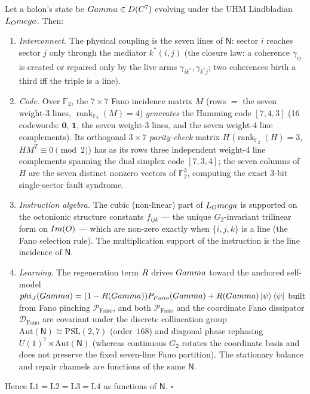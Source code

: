 \begin{theorem}\label{thm:collapse}
Let a holon's state be $Gamma\in D(C^7)$ evolving under the UHM
Lindbladian $L_Omega$. Then:
\begin{enumerate}[leftmargin=1.7em,itemsep=1pt]
  \item[\textbf{(L1)}] \emph{Interconnect.} The physical coupling is the seven
        lines of $\mathsf{N}$: sector $i$ reaches sector $j$ only through the
        mediator $k^\ast(i,j)$ (the closure law: a coherence
        $\gamma_{ij}$ is created or repaired only by the live arms
        $\gamma_{i k^\ast},\gamma_{k^\ast j}$; two coherences birth a third
        iff the triple is a line).
  \item[\textbf{(L2)}] \emph{Code.} Over $\mathbb{F}_2$, the $7\times 7$ Fano
        incidence matrix $M$ (rows $=$ the seven weight-$3$ lines,
        $\operatorname{rank}_{\mathbb{F}_2}(M)=4$) \emph{generates} the
        Hamming code $[7,4,3]$ (16 codewords: $\mathbf{0}$, $\mathbf{1}$, the
        seven weight-$3$ lines, and the seven weight-$4$ line complements). Its
        orthogonal $3\times 7$ \emph{parity-check} matrix $H$
        ($\operatorname{rank}_{\mathbb{F}_2}(H)=3$, $HM^T\equiv 0\pmod 2$) has
        as its rows three independent weight-$4$ line complements spanning the
        dual simplex code $[7,3,4]$; the seven columns of $H$ are the seven
        distinct nonzero vectors of $\mathbb{F}_2^3$, computing the exact
        $3$-bit single-sector fault syndrome.
  \item[\textbf{(L3)}] \emph{Instruction algebra.} The cubic (non-linear)
        part of $L_Omega$ is supported on the octonionic structure
        constants $f_{ijk}$ --- the unique $G_2$-invariant trilinear form on
        $Im(O)$ --- which are non-zero exactly when $\{i,j,k\}$ is
        a line (the Fano selection rule). The multiplication support of the
        instruction is the line incidence of $\mathsf{N}$.
  \item[\textbf{(L4)}] \emph{Learning.} The regeneration term $R$ drives
        $Gamma$ toward the anchored self-model
        $phi_J(Gamma)=(1-R(Gamma))P_{Fano}(Gamma) +
        R(Gamma)\ket{\psi}\bra{\psi}$ built from Fano pinching
        $\mathcal{P}_{\mathrm{Fano}}$, and both $\mathcal{P}_{\mathrm{Fano}}$
        and the coordinate Fano dissipator $\mathcal{D}_{\mathrm{Fano}}$ are
        covariant under the discrete collineation group
        $\mathrm{Aut}(\mathsf{N})\cong \mathrm{PSL}(2,7)$ (order~$168$) and
        diagonal phase rephasing $U(1)^7\rtimes \mathrm{Aut}(\mathsf{N})$
        (whereas continuous $G_2$ rotates the coordinate basis and does not
        preserve the fixed seven-line Fano partition). The stationary balance
        and repair channels are functions of the same $\mathsf{N}$.
\end{enumerate}
Hence $\mathrm{L1}=\mathrm{L2}=\mathrm{L3}=\mathrm{L4}$ as functions of
$\mathsf{N}$. \hfill$\square$
\end{theorem}

